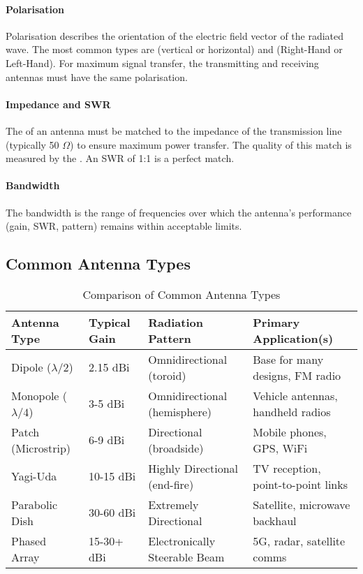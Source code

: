 \paragraph{Polarisation}
Polarisation describes the orientation of the electric field vector of the radiated wave. The most common types are  (vertical or horizontal) and  (Right-Hand or Left-Hand). For maximum signal transfer, the transmitting and receiving antennas must have the same polarisation.

\paragraph{Impedance and SWR}
The  of an antenna must be matched to the impedance of the transmission line (typically 50 $\Omega$) to ensure maximum power transfer. The quality of this match is measured by the . An SWR of 1:1 is a perfect match.

\paragraph{Bandwidth}
The bandwidth is the range of frequencies over which the antenna's performance (gain, SWR, pattern) remains within acceptable limits.


\subsection{Common Antenna Types}

\begin{table}[H]
    \centering
    \caption{Comparison of Common Antenna Types}
    \label{tab:antenna-types}
    \begin{tabular}{@{}llll@{}}
        \toprule
        \tableheaderfont Antenna Type & \tableheaderfont Typical Gain & \tableheaderfont Radiation Pattern & \tableheaderfont Primary Application(s) \\
        \midrule
        Dipole ($\lambda/2$) & 2.15 dBi & Omnidirectional (toroid) & Base for many designs, FM radio \\
        Monopole ($\lambda/4$) & 3-5 dBi & Omnidirectional (hemisphere) & Vehicle antennas, handheld radios \\
        Patch (Microstrip) & 6-9 dBi & Directional (broadside) & Mobile phones, GPS, WiFi \\
        Yagi-Uda & 10-15 dBi & Highly Directional (end-fire) & TV reception, point-to-point links \\
        Parabolic Dish & 30-60 dBi & Extremely Directional & Satellite, microwave backhaul \\
        Phased Array & 15-30+ dBi & Electronically Steerable Beam & 5G, radar, satellite comms \\
        \bottomrule
    \end{tabular}
\end{table}



